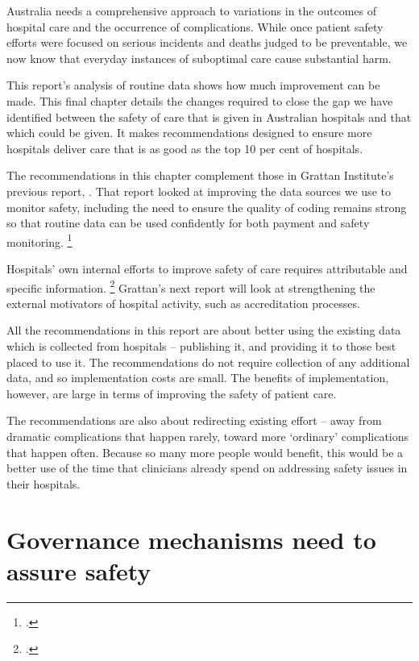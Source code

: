 \documentclass[FrontPage]{grattan}
\begin{document}
Australia needs a comprehensive approach to variations in the outcomes of hospital care and the occurrence of complications.
While once patient safety efforts were focused on serious incidents and deaths judged to be preventable, we now know that everyday instances of suboptimal care cause substantial harm.

This report's analysis of routine data shows how much improvement can be made.
This final chapter details the changes required to close the gap we have identified between the safety of care that is given in Australian hospitals and that which could be given.
It makes recommendations designed to ensure more hospitals deliver care that is as good as the top 10 per cent of hospitals.

The recommendations in this chapter complement those in Grattan Institute's previous report, .
That report looked at improving the data sources we use to monitor safety, including the need to ensure the quality of coding remains strong so that routine data can be used confidently for both payment and safety monitoring.%
	\footcite{DuckettEtAl-2017-Strengthening-safety-statistics}

Hospitals' own internal efforts to improve safety of care requires attributable and specific information.%
	\footcite{Levesquee014825}
Grattan's next report will look at strengthening the external motivators of hospital activity, such as accreditation processes.

All the recommendations in this report are about better using the existing data which is collected from hospitals -- publishing it, and providing it to those best placed to use it.
The recommendations do not require collection of any additional data, and so implementation costs are small.
The benefits of implementation, however, are large in terms of improving the safety of patient care.

The recommendations are also about redirecting existing effort -- away from dramatic complications that happen rarely, toward more `ordinary' complications that happen often.
Because so many more people would benefit, this would be a better use of the time that clinicians already spend on addressing safety issues in their hospitals.

\section{Governance mechanisms need to assure safety}\label{sec:governance-mechanisms-need-to-assure-safety}
\end{document}
